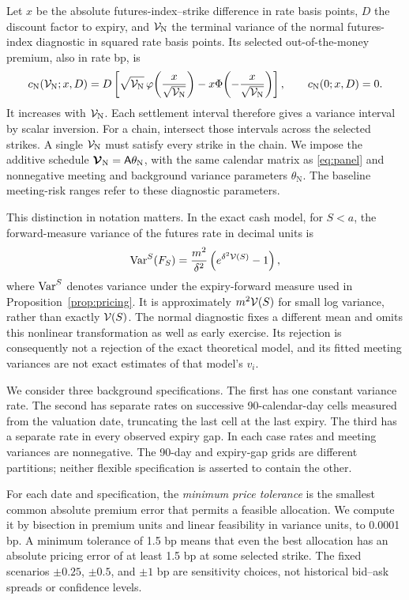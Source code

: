 Let $x$ be the absolute futures-index--strike difference in rate basis points, $D$ the discount factor to expiry, and $\mathcal V_{\mathrm N}$ the terminal variance of the normal futures-index diagnostic in squared rate basis points. Its selected out-of-the-money premium, also in rate bp, is
\begin{equation}\label{eq:normalproxy}
c_{\mathrm N}(\mathcal V_{\mathrm N};x,D)
=D\left[\sqrt{\mathcal V_{\mathrm N}}\,\varphi\!\left(\frac{x}{\sqrt{\mathcal V_{\mathrm N}}}\right)
          -x\Phi\!\left(-\frac{x}{\sqrt{\mathcal V_{\mathrm N}}}\right)\right],
\qquad c_{\mathrm N}(0;x,D)=0.
\end{equation}
It increases with $\mathcal V_{\mathrm N}$. Each settlement interval therefore gives a variance interval by scalar inversion. For a chain, intersect those intervals across the selected strikes. A single $\mathcal V_{\mathrm N}$ must satisfy every strike in the chain. We impose the additive schedule $\boldsymbol{\mathcal V}_{\mathrm N}=\mathsf A\theta_{\mathrm N}$, with the same calendar matrix as \eqref{eq:panel} and nonnegative meeting and background variance parameters $\theta_{\mathrm N}$. The baseline meeting-risk ranges refer to these diagnostic parameters.

This distinction in notation matters. In the exact cash model, for $S<a$, the forward-measure variance of the futures rate in decimal units is
\[
\operatorname{Var}^{S}(F_S)=\frac{m^2}{\delta^2}\left(e^{\delta^2\mathcal V(S)}-1\right),
\]
where $\operatorname{Var}^{S}$ denotes variance under the expiry-forward measure used in Proposition~\ref{prop:pricing}. It is approximately $m^2\mathcal V(S)$ for small log variance, rather than exactly $\mathcal V(S)$. The normal diagnostic fixes a different mean and omits this nonlinear transformation as well as early exercise. Its rejection is consequently not a rejection of the exact theoretical model, and its fitted meeting variances are not exact estimates of that model's $v_i$.

We consider three background specifications. The first has one constant variance rate. The second has separate rates on successive 90-calendar-day cells measured from the valuation date, truncating the last cell at the last expiry. The third has a separate rate in every observed expiry gap. In each case rates and meeting variances are nonnegative. The 90-day and expiry-gap grids are different partitions; neither flexible specification is asserted to contain the other.

For each date and specification, the \emph{minimum price tolerance} is the smallest common absolute premium error that permits a feasible allocation. We compute it by bisection in premium units and linear feasibility in variance units, to 0.0001 bp. A minimum tolerance of 1.5 bp means that even the best allocation has an absolute pricing error of at least 1.5 bp at some selected strike. The fixed scenarios $\pm0.25$, $\pm0.5$, and $\pm1$ bp are sensitivity choices, not historical bid--ask spreads or confidence levels.

